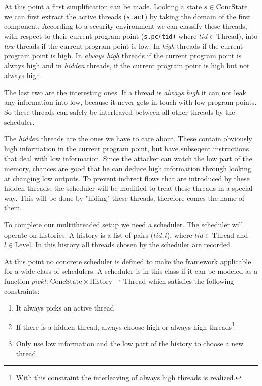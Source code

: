 \documentclass[a4paper,10pt]{llncs}
\begin{document}
At this point a first simplification can be made. Looking a state $s \in \text{ConcState}$ we can
first extract the active threads (\texttt{s.act}) by taking the domain of the first
component. According to a security environment we can classify these threads,
with respect to their current program point (\texttt{s.pc(tid)} where $tid \in \text{Thread}$),
into \textit{low} threads if the current program point is low. In \textit{high}
threads if the current program point is high. In \textit{always high} threads
if the current program point is always high and in \textit{hidden} threads, if
the current program point is high but not always high.

The last two are the interesting ones. If a thread is \textit{always high} it
can not leak any information into low, because it never gets in touch
with low program points. So these threads can safely be interleaved between all
other threads by the scheduler.

The \textit{hidden} threads are the ones we have to care about. These contain
obviously high information in the current program point, but have subseqent
instructions that deal with low information. Since the attacker can watch the
low part of the memory, chances are good that he can deduce high information
through looking at changing low outputs. To prevent indirect flows that are introduced by
these hidden threads, the scheduler will be modified to treat these threads
in a special way. This will be done by "hiding" these threads, therefore comes
the name of them.

To complete our multithreaded setup we need a scheduler. The scheduler will
operate on histories. A history is a list of pairs $(tid, l$), where $tid \in
\text{Thread}$ and $l \in \text{Level}$. In this history all threads chosen by the scheduler
are recorded.

At this point no concrete scheduler is defined to make the framework applicable
for a wide class of schedulers. A scheduler is in this class if it can be
modeled as a function $pickt: \text{ConcState} \times \text{History} \rightharpoonup \text{Thread}$
which satisfies the following constraints:

\begin{enumerate}
\item It always picks an active thread
\item If there is a hidden thread, always choose high or always high threads\footnote{With this constraint the interleaving of always high threads is realized.}
\item Only use low information and the low part of the history to choose a
      new thread
\end{enumerate}
\end{document}
